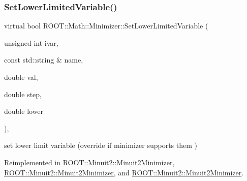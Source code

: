 \subsubsection{\texorpdfstring{SetLowerLimitedVariable()}{SetLowerLimitedVariable()}\hspace{0.1cm}{\footnotesize\ttfamily [2/3]}}
{\footnotesize\ttfamily virtual bool R\+O\+O\+T\+::\+Math\+::\+Minimizer\+::\+Set\+Lower\+Limited\+Variable (\begin{DoxyParamCaption}\item[{unsigned int}]{ivar,  }\item[{const std\+::string \&}]{name,  }\item[{double}]{val,  }\item[{double}]{step,  }\item[{double}]{lower }\end{DoxyParamCaption})\hspace{0.3cm}{\ttfamily [inline]}, {\ttfamily [virtual]}}



set lower limit variable (override if minimizer supports them ) 



Reimplemented in \mbox{\hyperlink{classROOT_1_1Minuit2_1_1Minuit2Minimizer_af38926946e36f7030cfc1c298ab9b222}{R\+O\+O\+T\+::\+Minuit2\+::\+Minuit2\+Minimizer}}, \mbox{\hyperlink{classROOT_1_1Minuit2_1_1Minuit2Minimizer_af38926946e36f7030cfc1c298ab9b222}{R\+O\+O\+T\+::\+Minuit2\+::\+Minuit2\+Minimizer}}, and \mbox{\hyperlink{classROOT_1_1Minuit2_1_1Minuit2Minimizer_af38926946e36f7030cfc1c298ab9b222}{R\+O\+O\+T\+::\+Minuit2\+::\+Minuit2\+Minimizer}}.

